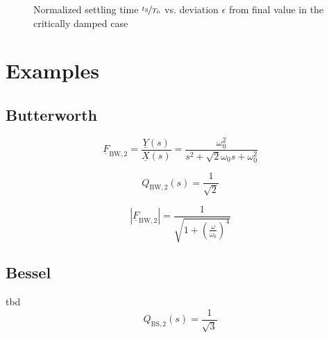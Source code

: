 \documentclass{article}[11pt]
\begin{document}
\begin{figure}[H]
  \centering
  \caption{Normalized settling time $\nicefrac{t_{\mathrm{S}}}{T_{\mathrm{0}}}$
    vs. deviation $\epsilon$ from final value in the critically damped case}
  \label{fig:settling-crit-damped}
\end{figure}


\section{Examples}\label{sec:examples}

\subsection{Butterworth}\label{subsec:examples:butterworth}

\begin{equation}
\underline{F}_{\mathrm{BW,2}} = \frac{\underline{Y}(s)}{\underline{X}(s)} 
                 = \frac{\omega_0^2}{s^2 + \sqrt{2} \omega_0 s + \omega_0^2 }
\end{equation}

\begin{equation}
Q_{\mathrm{BW,2}}(s) = \frac{1}{\sqrt{2}}
\end{equation}

\begin{equation}
\left|\underline{F}_{\mathrm{BW,2}}\right|
                 = \frac{1}{\sqrt{1+\left(\frac{\omega}{\omega_0}\right)^4}}
\end{equation}

\subsection{Bessel}
tbd
\begin{equation}
Q_{\mathrm{BS,2}}(s) = \frac{1}{\sqrt{3}}
\end{equation}
\end{document}
